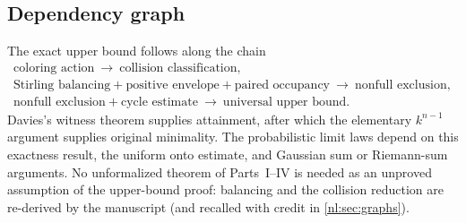 \documentclass[11pt,a4paper]{article}
\numberwithin{equation}{section}
\theoremstyle{definition}
\theoremstyle{remark}
\begin{document}
\subsection{Dependency graph}
The exact upper bound follows along the chain
\[
 \begin{gathered}
 \text{coloring action}\ \longrightarrow\ \text{collision classification},\\
 \text{Stirling balancing}+
 \text{positive envelope}+
 \text{paired occupancy}\ \longrightarrow\ \text{nonfull exclusion},\\
 \text{nonfull exclusion}+
 \text{cycle estimate}\ \longrightarrow\ \text{universal upper bound}.
 \end{gathered}
\]
Davies's witness theorem supplies attainment, after which the elementary
$k^{n-1}$ argument supplies original minimality. The probabilistic limit
laws depend on this exactness result, the uniform onto estimate, and
Gaussian sum or Riemann-sum arguments. No unformalized theorem of
Parts~I--IV is needed as an unproved assumption of the upper-bound proof:
balancing and the collision reduction are re-derived by the manuscript
(and recalled with credit in \cref{nl:sec:graphs}).
\end{document}
